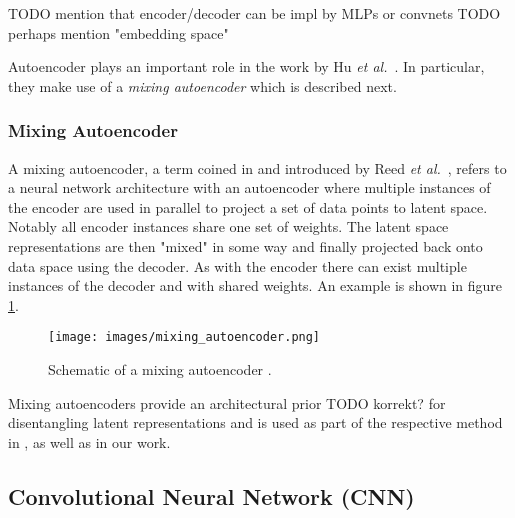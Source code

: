 \documentclass[12pt,a4paper]{article}
\begin{document}
TODO mention that encoder/decoder can be impl by MLPs or convnets
TODO perhaps mention "embedding space"

Autoencoder plays an important role in the work by Hu \textit{et al.}~\cite{DisentFacOfVarByMixTh}. In particular, they make use of a \textit{mixing autoencoder} which is described next.

\subsubsection{Mixing Autoencoder}\label{subsec:mixAE}
A mixing autoencoder, a term coined in \cite{DisentFacOfVarByMixTh} and introduced by Reed \textit{et al.}~\cite{DeepVisAnaMak}, refers to a neural network architecture with an autoencoder where multiple instances of the encoder are used in parallel to project a set of data points to latent space. Notably all encoder instances share one set of weights. The latent space representations are then "mixed" in some way and finally projected back onto data space using the decoder. As with the encoder there can exist multiple instances of the decoder and with shared weights. An example is shown in figure \ref{fig:mixing_autoencoder}. 
\begin{figure}[ht]
\centering
\texttt{[image: images/mixing\_autoencoder.png]}
\caption{Schematic of a mixing autoencoder \cite{DisentFacOfVarByMixTh}.}
\label{fig:mixing_autoencoder}
\end{figure}
Mixing autoencoders provide an architectural prior TODO korrekt? for disentangling latent representations and is used as part of the respective method in \cite{DeepVisAnaMak}, \cite{DisentFacOfVarByMixTh} as well as in our work.


\subsection{Convolutional Neural Network (CNN)}
\end{document}
